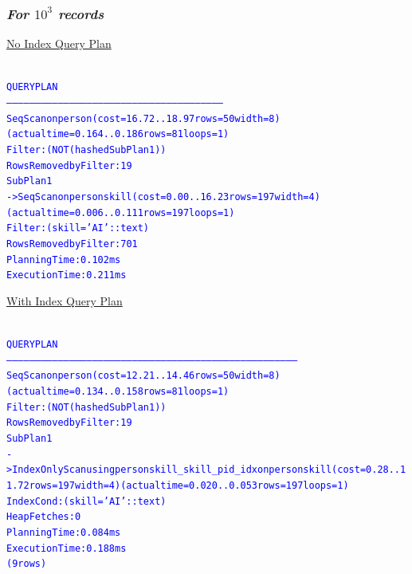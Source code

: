 \documentclass{article}
\begin{document}
    \subsubsection*{\emph{For $10^3$ records}}
    \underline{No Index Query Plan}
    \begin{center}
      {\tiny
      \begin{alltt}
      \textcolor{blue}{
        QUERY PLAN                                                    
        ------------------------------------------------------------------------------------------------------------------
         Seq Scan on person  (cost=16.72..18.97 rows=50 width=8) (actual time=0.164..0.186 rows=81 loops=1)
           Filter: (NOT (hashed SubPlan 1))
           Rows Removed by Filter: 19
           SubPlan 1
             ->  Seq Scan on personskill  (cost=0.00..16.23 rows=197 width=4) (actual time=0.006..0.111 rows=197 loops=1)
                   Filter: (skill = 'AI'::text)
                   Rows Removed by Filter: 701
         Planning Time: 0.102 ms
         Execution Time: 0.211 ms
       }
      \end{alltt}
      }
    \end{center}
    \underline{With Index Query Plan}
    \begin{center}
      {\tiny
      \begin{alltt}
      \textcolor{blue}{
        QUERY PLAN                                                                        
        ---------------------------------------------------------------------------------------------------------------------------------------------------------
         Seq Scan on person  (cost=12.21..14.46 rows=50 width=8) (actual time=0.134..0.158 rows=81 loops=1)
           Filter: (NOT (hashed SubPlan 1))
           Rows Removed by Filter: 19
           SubPlan 1
             ->  Index Only Scan using personskill_skill_pid_idx on personskill  (cost=0.28..11.72 rows=197 width=4) (actual time=0.020..0.053 rows=197 loops=1)
                   Index Cond: (skill = 'AI'::text)
                   Heap Fetches: 0
         Planning Time: 0.084 ms
         Execution Time: 0.188 ms
        (9 rows)
       }
      \end{alltt}
      }
    \end{center}
\end{document}
